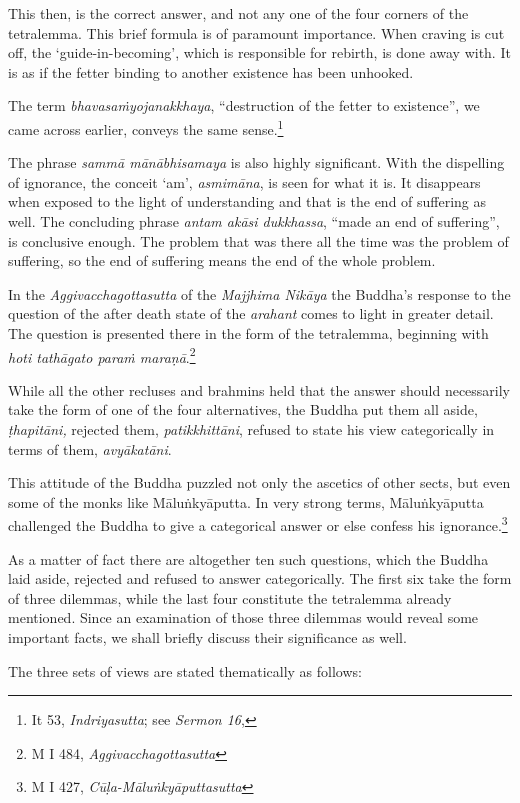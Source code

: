 This then, is the correct answer, and not any one of the four corners of the tetralemma. This brief formula is of paramount importance. When craving is cut off, the `guide-in-becoming', which is responsible for rebirth, is done away with. It is as if the fetter binding to another existence has been unhooked.

The term \emph{bhavasaṁyojanakkhaya}, ``destruction of the fetter to existence'', we came across earlier, conveys the same sense.\footnote{It 53, \emph{Indriyasutta}; see \emph{Sermon 16},}

The phrase \emph{sammā mānābhisamaya} is also highly significant. With the dispelling of ignorance, the conceit `am', \emph{asmimāna}, is seen for what it is. It disappears when exposed to the light of understanding and that is the end of suffering as well. The concluding phrase \emph{antam akāsi dukkhassa}, ``made an end of suffering'', is conclusive enough. The problem that was there all the time was the problem of suffering, so the end of suffering means the end of the whole problem.

In the \emph{Aggivacchagottasutta} of the \emph{Majjhima Nikāya} the Buddha's response to the question of the after death state of the \emph{arahant} comes to light in greater detail. The question is presented there in the form of the tetralemma, beginning with \emph{hoti tathāgato paraṁ maraṇā}.\footnote{M I 484, \emph{Aggivacchagottasutta}}

While all the other recluses and brahmins held that the answer should necessarily take the form of one of the four alternatives, the Buddha put them all aside, \emph{ṭhapitāni,} rejected them, \emph{patikkhittāni}, refused to state his view categorically in terms of them, \emph{avyākatāni}.

This attitude of the Buddha puzzled not only the ascetics of other sects, but even some of the monks like Māluṅkyāputta. In very strong terms, Māluṅkyāputta challenged the Buddha to give a categorical answer or else confess his ignorance.\footnote{M I 427, \emph{Cūḷa-Māluṅkyāputtasutta}}

As a matter of fact there are altogether ten such questions, which the Buddha laid aside, rejected and refused to answer categorically. The first six take the form of three dilemmas, while the last four constitute the tetralemma already mentioned. Since an examination of those three dilemmas would reveal some important facts, we shall briefly discuss their significance as well.

The three sets of views are stated thematically as follows:

